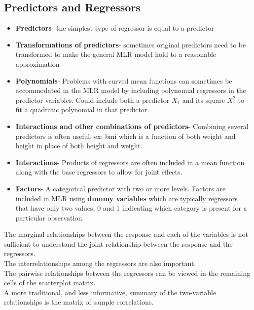\documentclass[openany]{book}
\numberwithin{equation}{section}
\begin{document}
\begin{flushleft}
\section{Predictors and Regressors}
\begin{itemize}
\item \textbf{Predictors}- the simplest type of regressor is equal to a predictor\\
\item \textbf{Transformations of predictors}- sometimes original predictors need to be transformed to make the general MLR model hold to a reasonable approximation\\
\item \textbf{Polynomials}- Problems with curved mean functions can sometimes be accommodated in the MLR model by including polynomial regressors in the predictor variables. Could include both a predictor $X_1$ and its square $X_1^2$ to fit a quadratic polynomial in that predictor.\\
\item \textbf{Interactions and other combinations of predictors}- Combining several predictors is often useful. ex: bmi which is a function of both weight and height in place of both height and weight.\\
\item \textbf{Interactions}- Products of regressors are often included in a mean function along with the base regressors to allow for joint effects.\\
\item \textbf{Factors}- A categorical predictor with two or more
levels. Factors are included in MLR using \textbf{dummy variables} which are typically regressors that have only two values, 0 and 1 indicating which category is present for a particular observation.\\
\end{itemize}
The marginal relationships between the response and each of the variables is not sufficient to understand the joint relationship between the response and the regressors.\\
The interrelationships among the regressors are also important.\\
The pairwise relationships between the regressors can be viewed in the remaining cells of the scatterplot matrix.\\
A more traditional, and less informative, summary of the two-variable
relationships is the matrix of sample correlations.\\

\end{flushleft}
\end{document}
